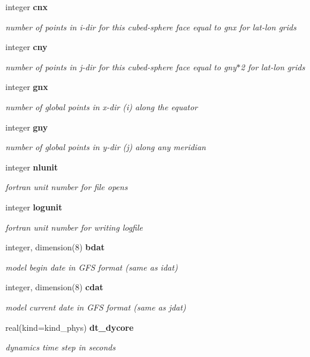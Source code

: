 \begin{DoxyCompactItemize}
integer \textbf{ cnx}
\begin{DoxyCompactList}\small\item\em number of points in i-\/dir for this cubed-\/sphere face equal to gnx for lat-\/lon grids \end{DoxyCompactList}\item 
integer \textbf{ cny}
\begin{DoxyCompactList}\small\item\em number of points in j-\/dir for this cubed-\/sphere face equal to gny$\ast$2 for lat-\/lon grids \end{DoxyCompactList}\item 
integer \textbf{ gnx}
\begin{DoxyCompactList}\small\item\em number of global points in x-\/dir (i) along the equator \end{DoxyCompactList}\item 
integer \textbf{ gny}
\begin{DoxyCompactList}\small\item\em number of global points in y-\/dir (j) along any meridian \end{DoxyCompactList}\item 
integer \textbf{ nlunit}
\begin{DoxyCompactList}\small\item\em fortran unit number for file opens \end{DoxyCompactList}\item 
integer \textbf{ logunit}
\begin{DoxyCompactList}\small\item\em fortran unit number for writing logfile \end{DoxyCompactList}\item 
integer, dimension(8) \textbf{ bdat}
\begin{DoxyCompactList}\small\item\em model begin date in G\+FS format (same as idat) \end{DoxyCompactList}\item 
integer, dimension(8) \textbf{ cdat}
\begin{DoxyCompactList}\small\item\em model current date in G\+FS format (same as jdat) \end{DoxyCompactList}\item 
real(kind=kind\+\_\+phys) \textbf{ dt\+\_\+dycore}
\begin{DoxyCompactList}\small\item\em dynamics time step in seconds \end{DoxyCompactList}\item 

\end{DoxyCompactItemize}
